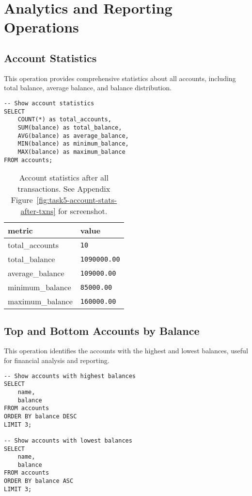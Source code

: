 \section{Analytics and Reporting Operations}

\subsection{Account Statistics}
This operation provides comprehensive statistics about all accounts, including total balance, average balance, and balance distribution.

\begin{verbatim}
-- Show account statistics
SELECT
    COUNT(*) as total_accounts,
    SUM(balance) as total_balance,
    AVG(balance) as average_balance,
    MIN(balance) as minimum_balance,
    MAX(balance) as maximum_balance
FROM accounts;
\end{verbatim}

\begin{table}[H]
  \centering
  \begin{tabular}{|l|l|}
    \hline
    \textbf{metric} & \textbf{value} \\
    \hline
    total\_accounts & \texttt{10} \\
    total\_balance & \texttt{1090000.00} \\
    average\_balance & \texttt{109000.00} \\
    minimum\_balance & \texttt{85000.00} \\
    maximum\_balance & \texttt{160000.00} \\
    \hline
  \end{tabular}
  \caption{Account statistics after all transactions. See Appendix Figure~\ref{fig:task5-account-stats-after-txns} for screenshot.}
\end{table}

\subsection{Top and Bottom Accounts by Balance}
This operation identifies the accounts with the highest and lowest balances, useful for financial analysis and reporting.

\begin{verbatim}
-- Show accounts with highest balances
SELECT
    name,
    balance
FROM accounts
ORDER BY balance DESC
LIMIT 3;

-- Show accounts with lowest balances
SELECT
    name,
    balance
FROM accounts
ORDER BY balance ASC
LIMIT 3;
\end{verbatim}

